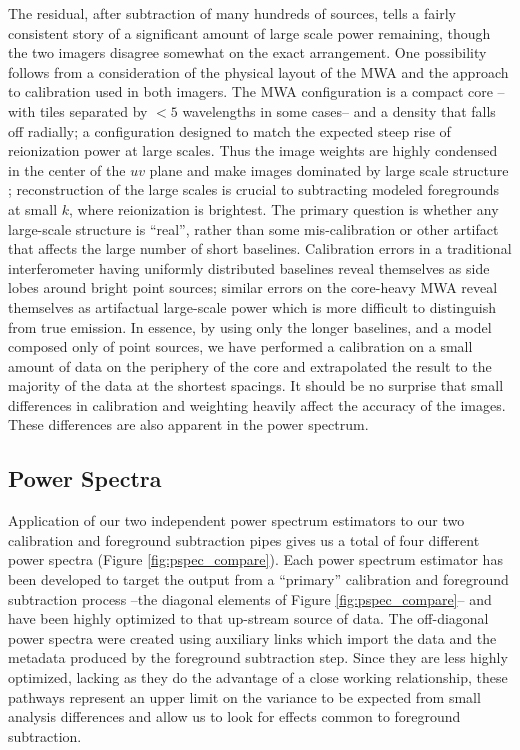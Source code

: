 \documentclass[preprint]{aastex}
\begin{document}
The residual, after subtraction of many hundreds of sources, tells a fairly consistent story of a significant amount of large scale power remaining, though the two imagers disagree somewhat on the exact arrangement.  One possibility follows from a consideration of the physical layout of the MWA and the  approach to calibration used in both imagers.  The MWA configuration is a compact core --with tiles separated by $<5$ wavelengths in some cases-- and a density that falls off radially; a configuration designed to match the expected steep rise of reionization power at large scales. Thus the image weights are highly condensed in the center of the $uv$ plane and make images dominated by large scale structure \cite{Beardsley:2013p9952}; reconstruction of the large scales is crucial to subtracting modeled foregrounds at small $k$, where reionization is brightest.   The primary question is whether any large-scale structure is ``real'', rather than some mis-calibration or other artifact that affects the large number of short baselines.  Calibration errors in a traditional interferometer having uniformly distributed baselines reveal themselves as side lobes around bright point sources; similar errors on the core-heavy MWA reveal themselves as artifactual large-scale power which is more difficult to distinguish from true emission.  In essence, by using only the longer baselines, and a model composed only of point sources, we have performed a calibration on a small amount of data on the periphery of the core and extrapolated the result to the majority of the data at the shortest spacings. It should be no surprise that small differences in calibration and weighting  heavily affect the accuracy of the images.  These differences are also apparent in the power spectrum.









\subsection{Power Spectra}
Application of our two independent power spectrum estimators to our two calibration and foreground subtraction pipes gives us a total of four different power spectra (Figure \ref{fig:pspec_compare}).  Each power spectrum estimator has been developed to target the output from a ``primary'' calibration and foreground subtraction process --the diagonal elements of Figure \ref{fig:pspec_compare}-- and have been highly optimized to that up-stream source of data.  The off-diagonal power spectra were created using auxiliary links which import the data and the metadata produced by the foreground subtraction step.  Since they are less highly optimized, lacking as they do the advantage of a close working relationship, these pathways represent an upper limit on the variance to be expected from small analysis differences and allow us to look for effects common to foreground subtraction.
\end{document}
